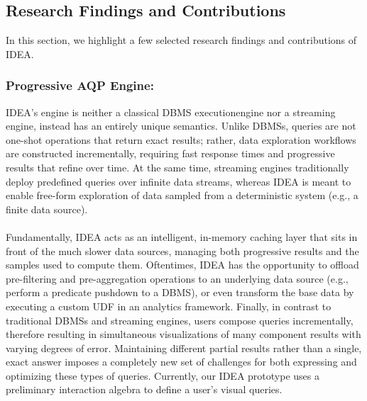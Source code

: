 \documentclass[12pt,letterpaper, onecolumn]{exam}
\begin{document}
    \subsection{Research Findings and Contributions}
    In this section, we highlight a few selected research findings and contributions of IDEA.
    
    \subsubsection{Progressive AQP Engine:} 
    IDEA’s engine is neither a classical DBMS executionengine nor a streaming engine, instead has an entirely unique semantics. Unlike DBMSs, queries are not one-shot operations that return exact results; rather, data exploration workflows are constructed incrementally, requiring fast response times and progressive results that refine over time. At the same time, streaming engines traditionally deploy predefined queries over infinite data streams, whereas IDEA is meant to enable free-form exploration of data sampled from a deterministic system (e.g., a finite data source).\\
    \\
    Fundamentally, IDEA acts as an intelligent, in-memory caching layer that sits in front of the much slower data sources, managing both progressive results and the samples used to compute them. Oftentimes, IDEA has the opportunity to offload pre-filtering and pre-aggregation operations to an underlying data source (e.g., perform a predicate pushdown to a DBMS), or even transform the base data by executing a custom UDF in an analytics framework. Finally, in contrast to traditional DBMSs and streaming engines, users compose queries incrementally, therefore resulting in simultaneous visualizations of many component results with varying degrees of error. Maintaining different partial results rather than a single, exact answer imposes a completely new set of challenges for both expressing and optimizing these types of queries. Currently, our IDEA prototype uses a preliminary interaction algebra to define a user’s visual queries.
\end{document}
